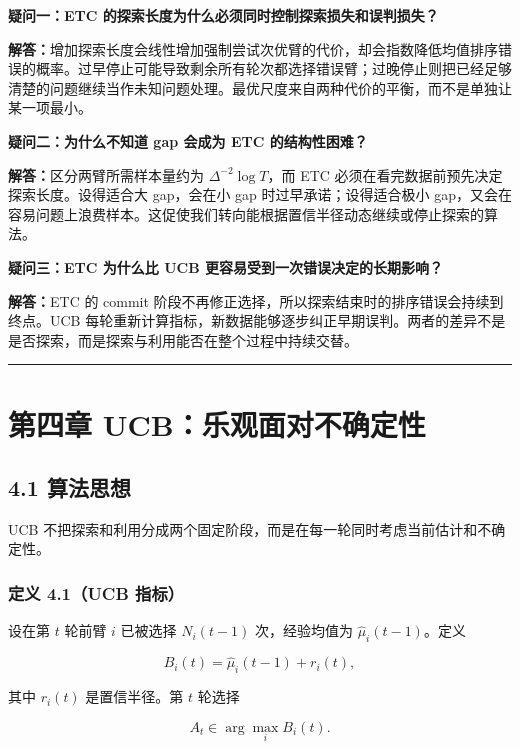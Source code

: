\documentclass[
  11pt,
  a4paper,
]{ctexart}
\begin{document}
\textbf{疑问一：ETC 的探索长度为什么必须同时控制探索损失和误判损失？}

\textbf{解答：}增加探索长度会线性增加强制尝试次优臂的代价，却会指数降低均值排序错误的概率。过早停止可能导致剩余所有轮次都选择错误臂；过晚停止则把已经足够清楚的问题继续当作未知问题处理。最优尺度来自两种代价的平衡，而不是单独让某一项最小。

\textbf{疑问二：为什么不知道 gap 会成为 ETC 的结构性困难？}

\textbf{解答：}区分两臂所需样本量约为 \(\Delta^{-2}\log T\)，而 ETC 必须在看完数据前预先决定探索长度。设得适合大 gap，会在小 gap 时过早承诺；设得适合极小 gap，又会在容易问题上浪费样本。这促使我们转向能根据置信半径动态继续或停止探索的算法。

\textbf{疑问三：ETC 为什么比 UCB 更容易受到一次错误决定的长期影响？}

\textbf{解答：}ETC 的 commit 阶段不再修正选择，所以探索结束时的排序错误会持续到终点。UCB 每轮重新计算指标，新数据能够逐步纠正早期误判。两者的差异不是是否探索，而是探索与利用能否在整个过程中持续交替。

\begin{center}\rule{0.5\linewidth}{0.5pt}\end{center}

\section{第四章
UCB：乐观面对不确定性}\label{ux7b2cux56dbux7ae0-ucbux4e50ux89c2ux9762ux5bf9ux4e0dux786eux5b9aux6027}

\subsection{4.1 算法思想}\label{ux7b97ux6cd5ux601dux60f3}

UCB
不把探索和利用分成两个固定阶段，而是在每一轮同时考虑当前估计和不确定性。

\subsubsection{定义 4.1（UCB
指标）}\label{ux5b9aux4e49-4.1ucb-ux6307ux6807}

设在第 \(t\) 轮前臂 \(i\) 已被选择 \(N_i(t-1)\) 次，经验均值为
\(\widehat\mu_i(t-1)\)。定义

\[
B_i(t)=\widehat\mu_i(t-1)+r_i(t),
\]

其中 \(r_i(t)\) 是置信半径。第 \(t\) 轮选择

\[
A_t\in\arg\max_iB_i(t).
\]
\end{document}
